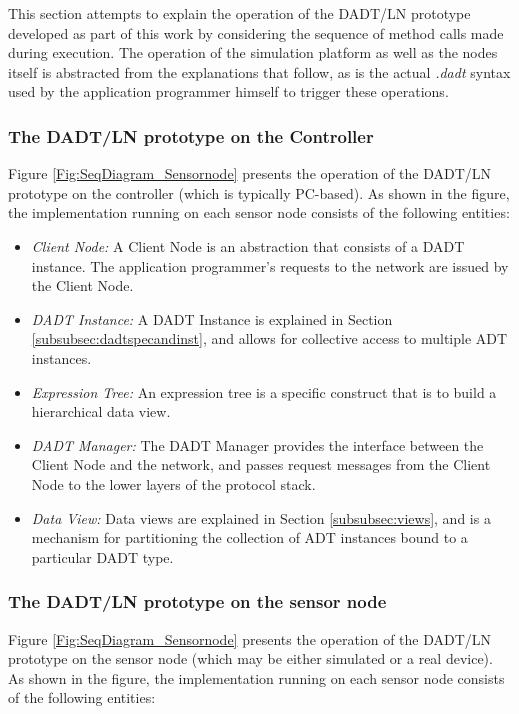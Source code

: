 This section attempts to explain the operation of the DADT/LN prototype
developed as part of this work by considering the sequence of method calls made
during execution. The operation of the simulation platform as well as the
nodes itself is abstracted from the explanations that follow, as is the actual
\emph{.dadt} syntax used by the application programmer himself to trigger these
operations. 

\subsubsection{The DADT/LN prototype on the Controller}

Figure \ref{Fig:SeqDiagram_Sensornode} presents the operation of the DADT/LN
prototype on the controller (which is typically PC-based). As shown in the figure, the implementation running on each sensor node 
consists of the following entities:

\begin{itemize}
  \item \emph{Client Node:} A Client Node is an abstraction that consists of a
  DADT instance. The application programmer's requests to the network are issued
  by the Client Node.
  \item \emph{DADT Instance:} A DADT Instance is explained in Section
  \ref{subsubsec:dadtspecandinst}, and allows for collective access to multiple
  ADT instances.
  \item \emph{Expression Tree:} An expression tree is a specific construct that is to
  build a hierarchical data view.
  \item \emph{DADT Manager:} The DADT Manager provides the interface between the
  Client Node and the network, and passes request messages from the Client Node
  to the lower layers of the protocol stack.
  \item \emph{Data View:} Data views are explained in Section
  \ref{subsubsec:views}, and is a mechanism for partitioning the collection of
  ADT instances bound to a particular DADT type.
  

\end{itemize}

\subsubsection{The DADT/LN prototype on the sensor node}

Figure \ref{Fig:SeqDiagram_Sensornode} presents the operation of the DADT/LN
prototype on the sensor node (which may be either simulated or a real
device). As shown in the figure, the implementation running on each sensor node 
consists of the following entities:

